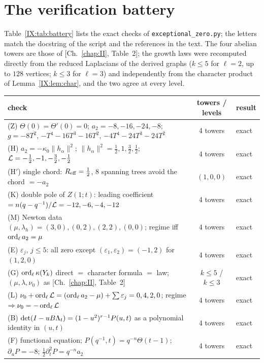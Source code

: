 \section{The verification battery}\label{IX:sec:battery}

Table~\ref{IX:tab:battery} lists the exact checks of \texttt{exceptional\_zero.py}; the
letters match the docstring of the script and the references in the text. The four
abelian towers are those of [Ch.~\ref{chap:II}, Table~2]; the growth laws were recomputed directly
from the reduced Laplacians of the derived graphs ($k\le5$ for $\ell=2$, up to $128$
vertices; $k\le3$ for $\ell=3$) and independently from the character product of
Lemma~\ref{IX:lem:char}, and the two agree at every level.

\begin{table}[ht]
\centering\scriptsize
\renewcommand{\arraystretch}{1.2}
\begin{tabular}{p{11.3cm}cl}
\toprule
check & towers / levels & result\\
\midrule
(Z) $\Theta(0)=\Theta'(0)=0$; $a_2=-8,-16,-24,-8$; $g=-8T^{2}$, $-T^{4}-16T^{3}-16T^{2}$, $-4T^{4}-24T^{3}-24T^{2}$ & 4 towers & exact\\
(H) $a_2=-\kappa_0\|h_\alpha\|^{2}$; $\|h_\alpha\|^{2}=\frac12,1,\frac32,\frac12$; $\mathcal{L}=-\frac12,-1,-\frac32,-\frac12$ & 4 towers & exact\\
(H$'$) single chord: $R_{\mathrm{eff}}=\frac12$, $8$ spanning trees avoid the chord $=-a_2$ & $(1,0,0)$ & exact\\
(K) double pole of $Z(1;t)$: leading coefficient $=n(q-q^{-1})/\mathcal{L}=-12,-6,-4,-12$ & 4 towers & exact\\
(M) Newton data $(\mu,\lambda_h)=(3,0),(0,2),(2,2),(0,0)$; regime iff $\operatorname{ord}_\ell a_2=\mu$ & 4 towers & exact\\
(E) $\varepsilon_j$, $j\le5$: all zero except $(\varepsilon_1,\varepsilon_2)=(-1,2)$ for $(1,2,0)$ & 4 towers & exact\\
(G) $\operatorname{ord}_\ell\kappa(Y_k)$ direct $=$ character formula $=$ law; $(\mu,\lambda,\nu_0)$ as [Ch.~\ref{chap:II}, Table~2] & $k\le5$ / $k\le3$ & exact\\
(L) $\nu_0+\operatorname{ord}_\ell\mathcal{L}=(\operatorname{ord}_\ell a_2-\mu)+\sum\varepsilon_j=0,4,2,0$; regime $\Rightarrow\nu_0=-\operatorname{ord}_\ell\mathcal{L}$ & 4 towers & exact\\
(B) $\det(I-uB\Lambda_t)=(1-u^{2})^{r-1}P(u,t)$ as a polynomial identity in $(u,t)$ & 4 towers & exact\\
(F) functional equation; $P(q^{-1},t)=q^{-n}\Theta(t-1)$; $\partial_uP=-8$; $\frac12\partial_t^{2}P=q^{-n}a_2$ & 4 towers & exact\\

\end{tabular}
\end{table}
